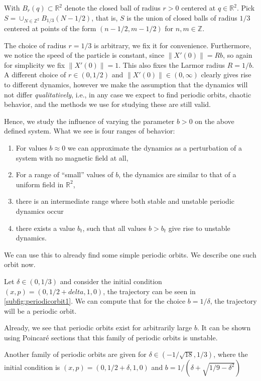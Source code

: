 \color{red}
With $B_r(q)\subset \mathbb R^2$ denote the closed ball of radius $r>0$ centered at $q\in\mathbb R^2$. Pick $S=\cup_{N\in\mathbb Z^2}B_{1/3}(N-1/2)$, that is, $S$ is the union of closed balls of radius $1/3$ centered at points of the form $(n-1/2,m-1/2)$ for $n,m\in\mathbb Z$.

The choice of radius $r=1/3$ is arbitrary, we fix it for convenience. Furthermore, we notice the speed of the particle is constant, since $\|X'(0)\|=Rb$, so again for simplicity we fix $\|X'(0)\|=1$. This also fixes the Larmor radius $R=1/b$. A different choice of $r\in (0,1/2)$ and $\|X'(0)\|\in(0,\infty)$ clearly gives rise to different dynamics, however we make the assumption that the dynamics will not differ \textit{qualitatively}, i.e., in any case we expect to find periodic orbits, chaotic behavior, and the methods we use for studying these are still valid.

Hence, we study the influence of varying the parameter $b>0$ on the above defined system. What we see is four ranges of behavior:
\begin{enumerate}
\item For values $b\approx0$ we can approximate the dynamics as a perturbation of a system with no magnetic field at all,
\item For a range of ``small'' values of $b$, the dynamics are similar to that of a uniform field in $\mathbb R^2$,
\item there is an intermediate range where both stable and unstable periodic dynamics occur
\item there exists a value $b_t$, such that all values $b>b_t$ give rise to unstable dynamics.
\end{enumerate}

We can use this to already find some simple periodic orbits. We describe one such orbit now.

Let $\delta\in(0,1/3)$ and consider the initial condition $(x,p) = (0,1/2+delta,1,0)$, the trajectory can be seen in \cref{subfig:periodicorbit1}. We can compute that for the choice $b=1/\delta$, the trajectory will be a periodic orbit.

Already, we see that periodic orbits exist for arbitrarily large $b$. It can be shown using Poincar\'e sections that this family of periodic orbits is unstable.

Another family of periodic orbits are given for $\delta\in(-1/\sqrt{18},1/3)$, where the initial condition is $(x,p)=(0,1/2+\delta,1,0)$ and $b = 1/(\delta+\sqrt{1/9-\delta^2})$

